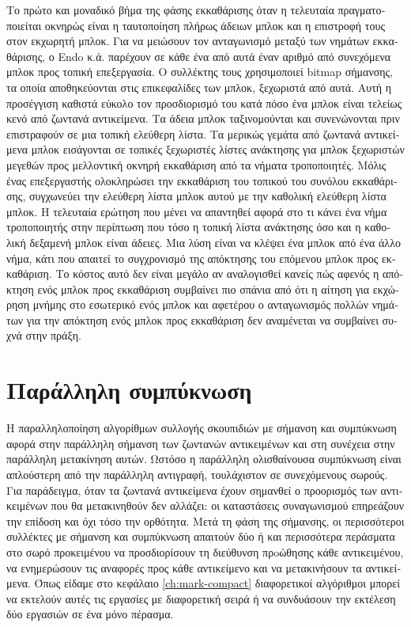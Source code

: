 \begin{greek}
 Το πρώτο και μοναδικό βήμα της φάσης εκκαθάρισης όταν η τελευταία
 πραγματοποιείται οκνηρώς είναι η ταυτοποίηση πλήρως άδειων μπλοκ
 και η επιστροφή τους στον εκχωρητή μπλοκ. Για να μειώσουν τον
 ανταγωνισμό μεταξύ των νημάτων εκκαθάρισης, ο Endo κ.ά. \cite{DBLP:conf/sc/EndoTY97}
 παρέχουν σε κάθε ένα από αυτά έναν αριθμό από συνεχόμενα μπλοκ
 προς τοπική επεξεργασία. Ο συλλέκτης τους χρησιμοποιεί bitmap
 σήμανσης, τα οποία αποθηκεύονται στις επικεφαλίδες των μπλοκ,
 ξεχωριστά από αυτά. Αυτή η προσέγγιση καθιστά εύκολο τον προσδιορισμό
 του κατά πόσο ένα μπλοκ είναι τελείως κενό από ζωντανά αντικείμενα.
 Τα άδεια μπλοκ ταξινομούνται και συνενώνονται πριν επιστραφούν
 σε μια τοπική ελεύθερη λίστα. Τα μερικώς γεμάτα από ζωντανά
 αντικείμενα μπλοκ εισάγονται σε τοπικές ξεχωριστές λίστες ανάκτησης
 για μπλοκ ξεχωριστών μεγεθών προς μελλοντική οκνηρή εκκαθάριση
 από τα νήματα τροποποιητές. Μόλις ένας επεξεργαστής ολοκληρώσει
 την εκκαθάριση του τοπικού του συνόλου εκκαθάρισης, συγχωνεύει
 την ελεύθερη λίστα μπλοκ αυτού με την καθολική ελεύθερη λίστα
 μπλοκ. Η τελευταία ερώτηση που μένει να απαντηθεί αφορά στο
 τι κάνει ένα νήμα τροποποιητής στην περίπτωση που τόσο η τοπική
 λίστα ανάκτησης όσο και η καθολική δεξαμενή μπλοκ είναι άδειες.
 Μια λύση είναι να κλέψει ένα μπλοκ από ένα άλλο νήμα, κάτι που
 απαιτεί το συγχρονισμό της απόκτησης του επόμενου μπλοκ προς
 εκκαθάριση. Το κόστος αυτό δεν είναι μεγάλο αν αναλογισθεί κανείς
 πώς αφενός η απόκτηση ενός μπλοκ προς εκκαθάριση συμβαίνει πιο
 σπάνια από ότι η αίτηση για εκχώρηση μνήμης στο εσωτερικό ενός
 μπλοκ και αφετέρου ο ανταγωνισμός πολλών νημάτων για την απόκτηση
 ενός μπλοκ προς εκκαθάριση δεν αναμένεται να συμβαίνει συχνά
 στην πράξη.

 \section{Παράλληλη συμπύκνωση}
 Η παραλληλοποίηση αλγορίθμων συλλογής σκουπιδιών με σήμανση
 και συμπύκνωση αφορά στην παράλληλη σήμανση των ζωντανών αντικειμένων
 και στη συνέχεια στην παράλληλη μετακίνηση αυτών. Ωστόσο η παράλληλη
 ολισθαίνουσα συμπύκνωση είναι απλούστερη από την παράλληλη
 αντιγραφή, τουλάχιστον σε συνεχόμενους σωρούς. Για παράδειγμα,
 όταν τα ζωντανά αντικείμενα έχουν σημανθεί ο προορισμός των αντικειμένων
 που θα μετακινηθούν δεν αλλάζει: οι καταστάσεις συναγωνισμού
 επηρεάζουν την επίδοση και όχι τόσο την ορθότητα. Μετά τη
 φάση της σήμανσης, οι περισσότεροι συλλέκτες με σήμανση και
 συμπύκνωση απαιτούν δύο ή και περισσότερα περάσματα στο σωρό
 προκειμένου να προσδιορίσουν τη διεύθυνση πρoώθησης κάθε αντικειμένου,
 να ενημερώσουν τις αναφορές προς κάθε αντικείμενο και να μετακινήσουν
 τα αντικείμενα. Όπως είδαμε στο κεφάλαιο \ref{ch:mark-compact}
 διαφορετικοί αλγόριθμοι μπορεί να εκτελούν αυτές τις εργασίες
 με διαφορετική σειρά ή να συνδυάσουν την εκτέλεση δύο εργασιών
 σε ένα μόνο πέρασμα.


\end{greek}
